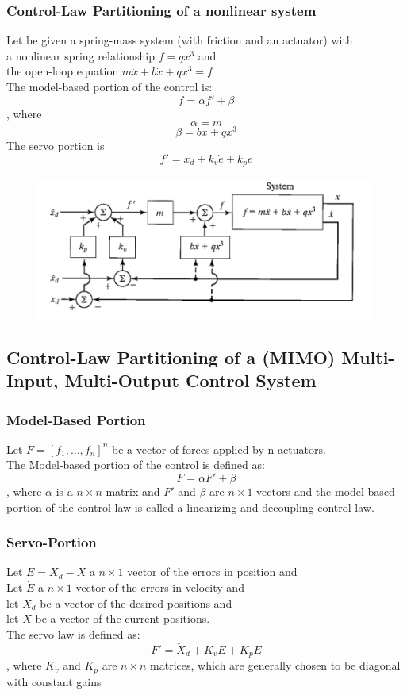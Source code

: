 \documentclass[10pt,a4paper]{article}
\begin{document}
\subsubsection{Control-Law Partitioning of a nonlinear system}
Let be given a spring-mass system (with friction and an actuator) with \\
a nonlinear spring relationship $f = qx^3$ and \\
the open-loop equation $m\ddot x + b \dot x + q x^3 = f$ \\
The model-based portion of the control is: 
$$
	f = \alpha f' + \beta
$$
, where
$$
	\alpha = m
$$
$$
	\beta = b \dot x + q x^3
$$
The servo portion is
$$
	f' = \ddot x_d + k_v \dot e + k_p e
$$

\begin{figure}[H]
	\includegraphics[width=0.5\columnwidth]{imgs/trajectory_following_nonlinear.png}
\end{figure}

\subsection{Control-Law Partitioning of a (MIMO) Multi-Input, Multi-Output Control System}
\subsubsection{Model-Based Portion}
Let $F = [f_1, \dots, f_n]^n$ be a vector of forces applied by n actuators. \\
The Model-based portion of the control is defined as: 
$$
	F = \alpha F' + \beta
$$
, where $\alpha$ is a $n \times n$ matrix and $F'$ and $\beta$ are $n \times 1$ vectors
and the model-based portion of the control law is called a linearizing and decoupling control law.

\subsubsection{Servo-Portion}
Let $E = X_d - X$ a $n \times 1$ vector of the errors in position and \\
Let $\dot E$ a $n \times 1$ vector of the errors in velocity and \\
let $X_d$ be a vector of the desired positions and \\
let $X$ be a vector of the current positions. \\
The servo law is defined as:
$$
	F' = \ddot X_d + K_v \dot E + K_p E
$$
, where $K_v$ and $K_p$ are $n \times n$ matrices, which are generally chosen to be diagonal with constant gains
\end{document}
